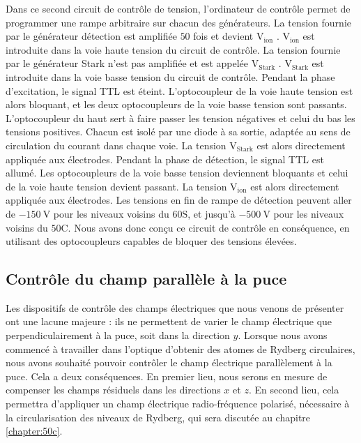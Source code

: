 Dans ce second circuit de contrôle de tension, l'ordinateur de contrôle permet de programmer une rampe arbitraire sur chacun des générateurs.
La tension fournie par le générateur \og détection \fg{} est amplifiée $\num{50}$ fois et devient \og $\mathrm{V_{ion}}$ \fg{}.
$\mathrm{V_{ion}}$ est introduite dans la voie haute tension du circuit de contrôle.
La tension fournie par le générateur \og Stark \fg{} n'est pas amplifiée et est appelée \og $\mathrm{V_{Stark}}$ \fg{}.
$\mathrm{V_{Stark}}$ est introduite dans la voie basse tension du circuit de contrôle.
Pendant la phase d'excitation, le signal TTL est éteint. L'optocoupleur de la voie haute tension est alors bloquant, et les deux optocoupleurs de la voie basse tension sont passants.
L'optocoupleur du haut sert à faire passer les tension négatives et celui du bas les tensions positives.
Chacun est isolé par une diode à sa sortie, adaptée au sens de circulation du courant dans chaque voie.
La tension $\mathrm{V_{Stark}}$ est alors directement appliquée aux électrodes.
Pendant la phase de détection, le signal TTL est allumé. Les optocoupleurs de la voie basse tension deviennent bloquants et celui de la voie haute tension devient passant.
La tension $\mathrm{V_{ion}}$ est alors directement appliquée aux électrodes.
Les tensions en fin de rampe de détection peuvent aller de $\SI{-150}{\V}$ pour les niveaux voisins du $\mathrm{60S}$, et jusqu'à $\SI{-500}{\V}$ pour les niveaux voisins du $\mathrm{50C}$.
Nous avons donc conçu ce circuit de contrôle en conséquence, en utilisant des optocoupleurs capables de bloquer des tensions élevées.

 \subsection{Contrôle du champ parallèle à la puce}%
\noindent Les dispositifs de contrôle des champs électriques que nous venons de présenter ont une lacune majeure :
ils ne permettent de varier le champ électrique que perpendiculairement à la puce, soit dans la direction $y$.
Lorsque nous avons commencé à travailler dans l'optique d'obtenir des atomes de Rydberg circulaires, nous avons souhaité pouvoir contrôler le champ électrique parallèlement à la puce.
Cela a deux conséquences.
En premier lieu, nous serons en mesure de compenser les champs résiduels dans les directions $x$ et $z$.
En second lieu, cela permettra d'appliquer un champ électrique radio-fréquence polarisé, nécessaire à la circularisation des niveaux de Rydberg, qui sera discutée au chapitre \ref{chapter:50c}.


